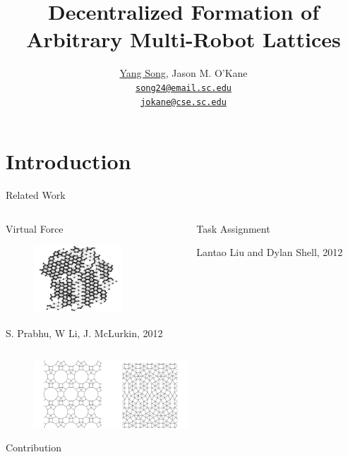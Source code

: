 \documentclass[10pt]{beamer}
\title{Decentralized Formation of Arbitrary Multi-Robot Lattices}
\author{
  \underline{Yang Song}, Jason M. O'Kane\\
  \href{mailto:song24@email.sc.edu}{{\tt song24@email.sc.edu} \\
  \href{mailto:jokane@cse.sc.edu}{\tt jokane@cse.sc.edu}}
}
\institute[
  Dept.\ of Computer Science and Engineering\\
  University of South Carolina
] %
{%
  Dept. of Computer Science and Engineering\\
  University of South Carolina
  
}
\begin{document}
\begin{frame}[plain] %
  \titlepage
\end{frame}

\section{Introduction}
\begin{frame}{Related Work}{}
    \begin{columns}[T] %
      \begin{column}{.45\textwidth}
        \small{Virtual Force}
        \begin{figure}
          \centering
          \includegraphics[height=1in]{figs/james.png}
        \end{figure}
        \footnotesize{S. Prabhu, W Li, J. McLurkin, 2012}
      \end{column}%
      \begin{column}{.45\textwidth}
        \small{Task Assignment}
        \begin{center}
        \end{center}
        \footnotesize{ Lantao Liu and Dylan Shell, 2012}
      \end{column}%
    \end{columns}
    \begin{figure}
      \centering
      \includegraphics[height=1in]{figs/tessellation.png}
    \end{figure}
\end{frame}

\begin{frame}{Contribution}{}
\begin{block}{}
  \begin{columns}[T] %
    \begin{column}{.5\textwidth}
    \end{column}%
    \begin{column}{.5\textwidth}
    \end{column}%
  \end{columns} 
\end{block}
\end{frame}
\end{document}
